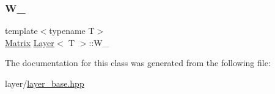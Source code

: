 \subsubsection{\texorpdfstring{W\_}{W\_}}
{\footnotesize\ttfamily template$<$typename T$>$ \\
\mbox{\hyperlink{class_layer_a22b1e7286096aa62bd245536c8ebdaf1}{Matrix}} \mbox{\hyperlink{class_layer}{Layer}}$<$ T $>$\+::W\+\_\+\hspace{0.3cm}{\ttfamily [protected]}}



The documentation for this class was generated from the following file\+:\begin{DoxyCompactItemize}
\item 
layer/\mbox{\hyperlink{layer__base_8hpp}{layer\+\_\+base.\+hpp}}\end{DoxyCompactItemize}
